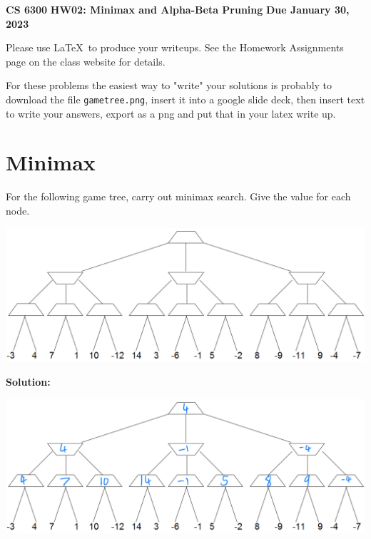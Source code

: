 \documentclass[11pt]{article}
\begin{document}
\thispagestyle{empty}

\begin{center}
{\bf CS 6300} \hfill {\large\bf HW02:  Minimax and Alpha-Beta Pruning} \hfill {\bf Due January 30, 2023}
\end{center}

Please use \LaTeX\ to produce your writeups. See the Homework Assignments 
page on the class website for details.

For these problems the easiest way to "write" your solutions is probably to download the file \texttt{gametree.png}, insert it into a google slide deck, then insert text to write your answers, export as a png and put that in your latex write up.


\section{Minimax}

For the following game tree, carry out minimax search. Give the value for each node.

\begin{center}
\includegraphics[width=\linewidth]{gametree.png}
\end{center}

\bf Solution:

\begin{center}
\includegraphics[width=\linewidth]{Q1.png}
\end{center}

\pagebreak
\end{document}

